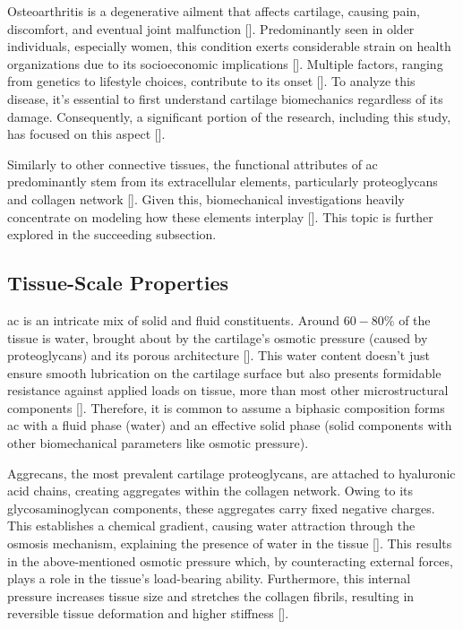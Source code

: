\documentclass[12pt,a4paper]{report}
\begin{document}
Osteoarthritis is a degenerative ailment that affects cartilage, causing pain, discomfort, and eventual joint malfunction [\cite{lespasio2017}]. Predominantly seen in older individuals, especially women, this condition exerts considerable strain on health organizations due to its socioeconomic implications [\cite{Chen2012,gillian2019}]. Multiple factors, ranging from genetics to lifestyle choices, contribute to its onset [\cite{loeser2016,mobasheri2017,astephen2021}]. To analyze this disease, it's essential to first understand cartilage biomechanics regardless of its damage. Consequently, a significant portion of the research, including this study, has focused on this aspect [\cite{kong2022}].

Similarly to other connective tissues, the functional attributes of \ac{ac} predominantly stem from its extracellular elements, particularly proteoglycans and collagen network [\cite{culav1999,brody2015}]. Given this, biomechanical investigations heavily concentrate on modeling how these elements interplay [\cite{klika2016,ebrahimi2019,sajjadinia2019,lin2021,paz2022}]. This topic is further explored in the succeeding subsection.

\subsection{Tissue-Scale Properties}
\Ac{ac} is an intricate mix of solid and fluid constituents. Around $60-80\%$ of the tissue is water, brought about by the cartilage's osmotic pressure (caused by proteoglycans) and its porous architecture [\cite{cederlund2022}]. This water content doesn't just ensure smooth lubrication on the cartilage surface but also presents formidable resistance against applied loads on tissue, more than most other microstructural components [\cite{quiroga2017,sajjadinia2019}]. Therefore, it is common to assume a biphasic composition forms \ac{ac} with a fluid phase (water) and an effective solid phase (solid components with other biomechanical parameters like osmotic pressure).

Aggrecans, the most prevalent cartilage proteoglycans, are attached to hyaluronic acid chains, creating aggregates within the collagen network. Owing to its glycosaminoglycan components, these aggregates carry fixed negative charges. This establishes a chemical gradient, causing water attraction through the osmosis mechanism, explaining the presence of water in the tissue [\cite{kiani2002,gomez2020,johnson2021}]. This results in the above-mentioned osmotic pressure which, by counteracting external forces, plays a role in the tissue's load-bearing ability. Furthermore, this internal pressure increases tissue size and stretches the collagen fibrils, resulting in reversible tissue deformation and higher stiffness [\cite{dudhia2005}].
\end{document}
